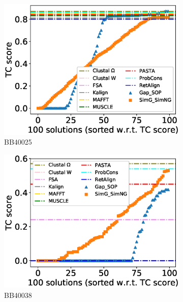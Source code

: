\begin{figure}[!htbp]
\begin{adjustwidth}{-1.5cm}{-1cm}
\begin{subfigure}{0.22\textwidth}
			\includegraphics[width=\columnwidth]{Figure/summary/precomputedInit/Balibase/BB40025_tc_density_single_run_2}
			\caption{BB40025}
		\end{subfigure}
		\begin{subfigure}{0.22\textwidth}
			\includegraphics[width=\columnwidth]{Figure/summary/precomputedInit/Balibase/BB40038_tc_density_single_run_2}
			\caption{BB40038}
		\end{subfigure}
		\begin{subfigure}{0.22\textwidth}

\end{subfigure}
\end{adjustwidth}
\end{figure}
